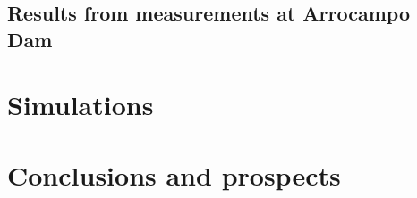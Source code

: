 \documentclass[12pt,a4paper]{book}
\begin{document}
	\section{Results from measurements at Arrocampo Dam}
	\newpage	

\chapter{Simulations}  \label{chap:Simulations}
%
\newpage	

\chapter{Conclusions and prospects}  \label{chap:Conclusions}
%
\newpage



%
	

	
	
	
\end{document}
